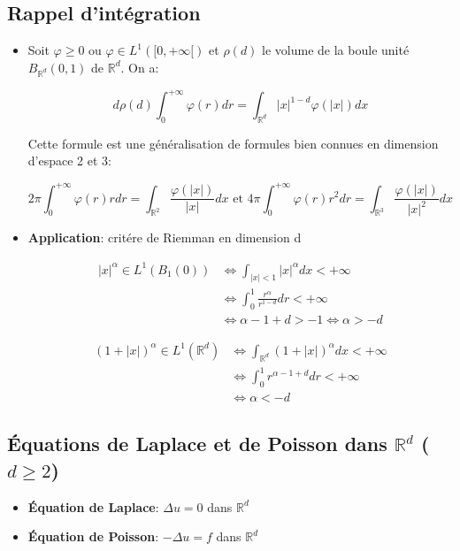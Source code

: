\documentclass[10pt,a4paper,oneside]{article}
\begin{document}
\subsection{Rappel d'intégration}

\begin{itemize}
\item
Soit $\varphi \geq 0$ ou $\varphi \in L^1([0,+\infty[)$ et $\rho(d)$ le volume de la boule unité $B_{\mathbb{R}^d}(0,1)$ de $\mathbb{R}^d$. On a:

\[ d \rho(d) \int_{0}^{+\infty} \varphi(r) dr = \int_{\mathbb{R}^d} |x|^{1 - d} \varphi(|x|) dx \]

Cette formule est une généralisation de formules bien connues en dimension d'espace 2 et 3:

\[ 2 \pi \int_{0}^{+\infty} \varphi(r) r dr = \int_{\mathbb{R}^2} \frac{\varphi(|x|)}{|x|} dx \text{ et } 4 \pi \int_{0}^{+\infty} \varphi(r) r^2 dr = \int_{\mathbb{R}^3} \frac{\varphi(|x|)}{|x|^2} dx \]

\item
\textbf{Application}: critére de Riemman en dimension d

\begin{align*}
|x|^\alpha \in L^1(B_1(0)) &\Leftrightarrow \int_{|x| < 1} |x|^\alpha dx < +\infty \\
&\Leftrightarrow \int_{0}^{1} \frac{r^\alpha}{r^{1 - d}} dr < +\infty \\
&\Leftrightarrow \alpha - 1 + d > -1 \Leftrightarrow \alpha > -d
\end{align*}

\begin{align*}
(1 + |x|)^\alpha \in L^1(\mathbb{R}^d) &\Leftrightarrow \int_{\mathbb{R}^d} (1 + |x|)^\alpha dx < +\infty \\
&\Leftrightarrow \int_{0}^{1} r^{\alpha - 1 + d} dr < +\infty \\
&\Leftrightarrow \alpha < -d
\end{align*}

\end{itemize}

\subsection{Équations de Laplace et de Poisson dans $\mathbb{R}^d$ ($d \geq 2$)}

\begin{itemize}
\item
\textbf{Équation de Laplace}: $\Delta u = 0$ dans $\mathbb{R}^d$

\item
\textbf{Équation de Poisson}: $-\Delta u = f$ dans $\mathbb{R}^d$
\end{itemize}
\end{document}
